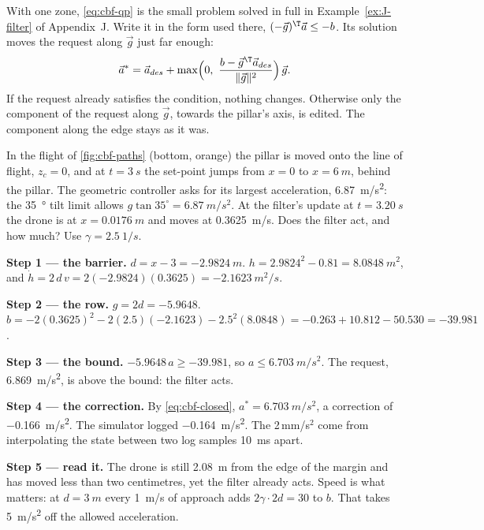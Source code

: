 With one zone, \cref{eq:cbf-qp} is the small problem solved in full in Example~\ref{ex:J-filter} of Appendix~J. Write it in the form used there, $(-\vec g)^\T\vec a \le -b$. Its solution moves the request along $\vec g$ just far enough:
\begin{equation}\label{eq:cbf-closed}
  \vec a^* = \vec a_{des} + \max\!\Big(0,\ \frac{b - \vec g^\T\vec a_{des}}{\|\vec g\|^2}\Big)\,\vec g .
\end{equation}
If the request already satisfies the condition, nothing changes. Otherwise only the component of the request along $\vec g$, towards the pillar's axis, is edited. The component along the edge stays as it was.

\begin{example}
\label{ex:cbf-wake}
In the flight of \cref{fig:cbf-paths} (bottom, orange) the pillar is moved onto the line of flight, $z_c = 0$, and at $t = \SI{3}{s}$ the set-point jumps from $x = 0$ to $x = \SI{6}{m}$, behind the pillar. The geometric controller asks for its largest acceleration, \SI{6.87}{m/s^2}: the \SI{35}{\degree} tilt limit allows $g\tan 35^\circ = \SI{6.87}{m/s^2}$. At the filter's update at $t = \SI{3.20}{s}$ the drone is at $x = \SI{0.0176}{m}$ and moves at \SI{0.3625}{m/s}. Does the filter act, and how much? Use $\gamma = \SI{2.5}{1/s}$.

\textbf{Step 1 — the barrier.} $d = x - 3 = \SI{-2.9824}{m}$. $h = 2.9824^2 - 0.81 = \SI{8.0848}{m^2}$, and $\dot h = 2\,d\,v = 2(-2.9824)(0.3625) = \SI{-2.1623}{m^2/s}$.

\textbf{Step 2 — the row.} $g = 2d = -5.9648$. $b = -2(0.3625)^2 - 2(2.5)(-2.1623) - 2.5^2(8.0848) = -0.263 + 10.812 - 50.530 = -39.981$.

\textbf{Step 3 — the bound.} $-5.9648\,a \ge -39.981$, so $a \le \SI{6.703}{m/s^2}$. The request, \SI{6.869}{m/s^2}, is above the bound: the filter acts.

\textbf{Step 4 — the correction.} By \cref{eq:cbf-closed}, $a^* = \SI{6.703}{m/s^2}$, a correction of \SI{-0.166}{m/s^2}. The simulator logged \SI{-0.164}{m/s^2}. The 2\,mm/s$^2$ come from interpolating the state between two log samples \SI{10}{ms} apart.

\textbf{Step 5 — read it.} The drone is still \SI{2.08}{m} from the edge of the margin and has moved less than two centimetres, yet the filter already acts. Speed is what matters: at $d = \SI{3}{m}$ every \SI{1}{m/s} of approach adds $2\gamma\cdot 2d = 30$ to $b$. That takes \SI{5}{m/s^2} off the allowed acceleration.
\end{example}


